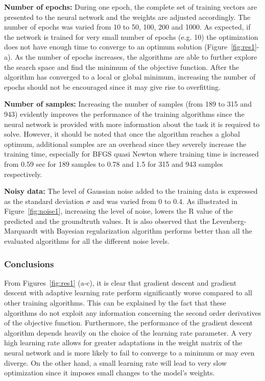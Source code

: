 \documentclass[conference,compsoc]{IEEEtran}
\begin{document}
\textbf{Number of epochs:} During one epoch, the complete set of training vectors are presented to the neural network and the weights are adjusted accordingly. The number of epochs was varied from 10 to 50, 100, 200 and 1000. As expected, if the network is trained for very small number of epochs (e.g. 10) the optimization does not have enough time to converge to an optimum solution (Figure~\ref{fig:res1}-a). As the number of epochs increases, the algorithms are able to further explore the search space and find the minimum of the objective function. After the algorithm has converged to a local or global minimum, increasing the number of epochs should not be encouraged since it may give rise to overfitting.

\textbf{Number of samples:} Increasing the number of samples (from 189 to 315 and 943) evidently improves the performance of the training algorithms since the neural network is provided with more information about the task it is required to solve. However, it should be noted that once the algorithm reaches a global optimum, additional samples are an overhead since they severely increase the training time, especially for BFGS quasi Newton where training time is increased from 0.59 sec for 189 samples to 0.78 and 1.5 for 315 and 943 samples respectively.

\textbf{Noisy data:} The level of Gaussian noise added to the training data is expressed as the standard deviation $\sigma$ and was varied from 0 to 0.4. As illustrated in Figure~\ref{fig:noise1}, increasing the level of noise, lowers the R value of the predicted and the groundtruth values. It is also observed that the Levenberg-Marquardt with Bayesian regularization algorithm performs better than all the evaluated algorithms for all the different noise levels.

\subsubsection{Conclusions}
From Figures~\ref{fig:res1} (a-c), it is clear that gradient descent and gradient descent with adaptive learning rate perform significantly worse compared to all other training algorithms. This can be explained by the fact that these algorithms do not exploit any information concerning the second order derivatives of the objective function. Furthermore, the performance of the gradient descent algorithm depends heavily on the choice of the learning rate parameter. A very high learning rate allows for greater adaptations in the weight matrix of the neural network and is more likely to fail to converge to a minimum or may even diverge. On the other hand, a small learning rate will lead to very slow optimization since it imposes small changes to the model's weights.
\end{document}

